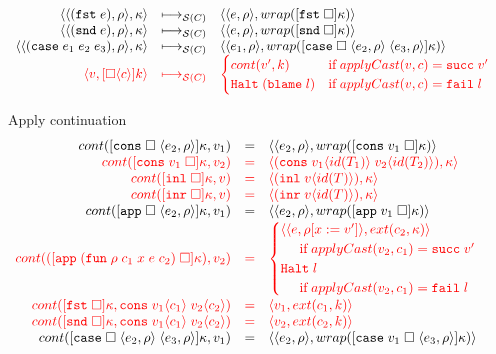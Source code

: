 \documentclass[acmsmall,review,anonymous]{acmart}\settopmatter{printfolios=true,printccs=false,printacmref=false}
\newcommand{\funrule}[3]{#1 &=& #2 & #3\\}
\newcommand{\hifunrule}[3]{\highlight{#1} &\highlight{=}& \highlight{#2} & 
\highlight{#3}\\}
\newcommand{\sOOinspect}[3]{\langle\langle#1,#2\rangle,#3\rangle}
\newcommand{\sOOreturn}[2]{\langle#1,#2\rangle}
\newcommand{\sOOhalt}[1]{\mathtt{Halt} \; #1}
\newcommand{\eOOcar}[1]{\mathtt{fst} \; #1}
\newcommand{\eOOcdr}[1]{\mathtt{snd} \; #1}
\newcommand{\eOOcase}[3]{\mathtt{case} \; #1 \; #2 \; #3}
\newcommand{\oOOblame}[1]{\mathtt{blame} \; #1}
\newcommand{\rOOsucc}[1]{\mathtt{succ}\;#1}
\newcommand{\rOOfail}[1]{\mathtt{fail}\;#1}
\newcommand{\kOOconsI}[3]{[\mathtt{cons} \; \square \; \langle#1,#2\rangle ]#3}
\newcommand{\kOOconsII}[2]{[\mathtt{cons} \; #1 \; \square]#2}
\newcommand{\kOOinl}[1]{[\mathtt{inl} \; \square]#1}
\newcommand{\kOOinr}[1]{[\mathtt{inr} \; \square]#1}
\newcommand{\kOOappI}[3]{
	[\mathtt{app} \; \square \; \langle#1,#2\rangle ]#3
}
\newcommand{\kOOappII}[2]{
	[\mathtt{app} \; #1 \; \square]#2}
\newcommand{\kOOcar}[1]{[\mathtt{fst} \; \square]#1}
\newcommand{\kOOcdr}[1]{[\mathtt{snd} \; \square]#1}
\newcommand{\kOOcaseI}[4]{
	[\mathtt{case} \; \square \; \langle#1,#3\rangle \; \langle#2,#3\rangle ]#4}
\newcommand{\kOOcaseII}[4]{
	[\mathtt{case} \; #1 \; \square \; \langle#2,#3\rangle ]#4}
\newcommand{\kOOcast}[2]{
	[\square \langle #1 \rangle]#2}
\newcommand{\hcvOOfun}[5]{\mathtt{fun} \; #2 \; #1 \; #3 \; #4 \; #5}
\newcommand{\hcvOOcons}[4]{\mathtt{cons}\;#1\langle#2\rangle\;#3\langle#4\rangle}
\newcommand{\hcvOOinl}[2]{\mathtt{inl}\;#1\langle#2\rangle}
\newcommand{\hcvOOinr}[2]{\mathtt{inr}\;#1\langle#2\rangle}
\newcommand{\sidecond}[1]{\text{if}\;#1}
\newcommand{\redruleS}[3]{#1 & \longmapsto_{\mathcal{S}(C)} & #2 & #3\\}
\newcommand{\hiredruleS}[3]{\highlight{#1} & 
\highlight{\longmapsto_{\mathcal{S}(C)}} & \highlight{#2} & \highlight{#3} \\}
\newcommand{\continue}[2]{cont(#2,#1)}
\newcommand{\highlight}[1]{{\color{red} #1}}
\begin{document}
\begin{figure}
\[\begin{array}{rclr}
	\redruleS{
		\sOOinspect{(\eOOcar{e})}{\rho}{\kappa}}{
		\sOOinspect{e}{\rho}{wrap(\kOOcar{\kappa})}}{}
	
	\redruleS{
		\sOOinspect{(\eOOcdr{e})}{\rho}{\kappa}}{
		\sOOinspect{e}{\rho}{wrap(\kOOcdr{\kappa})}}{}
	
	\redruleS{
		\sOOinspect{(\eOOcase{e_1}{e_2}{e_3})}{\rho}{\kappa}}{
		\sOOinspect{e_1}{\rho}{wrap(\kOOcaseI{e_2}{e_3}{\rho}{\kappa})}}{}
	\hiredruleS{
		\sOOreturn{v}{\kOOcast{c}{k}}
	}{
	\begin{cases}
	\continue{k}{v'} & \sidecond{applyCast(v,c) = \rOOsucc{v'}} 
	\\
	\sOOhalt{(\oOOblame{l})} & \sidecond{applyCast(v,c) = \rOOfail{l}}
	\end{cases}
	}{}
	\end{array}
	\]
	
	Apply continuation
	\fbox{$\continue{k}{v} = s$}
	\[
	\begin{array}{rclr}
	

\funrule{
	\continue{v_1}{\kOOconsI{e_2}{\rho}{\kappa}}}{
	\sOOinspect{e_2}{\rho}{wrap(\kOOconsII{v_1}{\kappa})}}{}

\hifunrule{
	\continue{v_2}{\kOOconsII{v_1}{\kappa}}}{
	\sOOreturn{(\hcvOOcons{v_1}{id(T_1)}{v_2}{id(T_2)})}{\kappa}}{}

\hifunrule{
	\continue{v}{\kOOinl{\kappa}}}{
	\sOOreturn{(\hcvOOinl{v}{id(T)})}{\kappa}}{}

\hifunrule{
	\continue{v}{\kOOinr{\kappa}}}{
	\sOOreturn{(\hcvOOinr{v}{id(T)})}{\kappa}}{}

\funrule{
	\continue{v_1}{\kOOappI{e_2}{\rho}{\kappa}}}{
	\sOOinspect{e_2}{\rho}{
		wrap(\kOOappII{v_1}{\kappa})
	}}{}
\hifunrule{
	\continue{v_2}{(\kOOappII{(\hcvOOfun{c_1}{\rho}{x}{e}{c_2})}{\kappa})}}{
\begin{cases}
	\sOOinspect{e}{\rho[x:=v']}{ext(c_2,\kappa)} \\
\;\;\;\;\;\sidecond{applyCast(v_2,c_1) = \rOOsucc{v'}}
\\
\sOOhalt{l} \\
\;\;\;\;\;\sidecond{applyCast(v_2,c_1) = \rOOfail{l}}
\end{cases}
}{}

\hifunrule{
	\continue{\hcvOOcons{v_1}{c_1}{v_2}{c_2}}{
		\kOOcar{\kappa}
	}
}{
	\sOOreturn{v_1}{ext(c_1,k)}
}{}
\hifunrule{
	\continue{\hcvOOcons{v_1}{c_1}{v_2}{c_2}}{
		\kOOcdr{\kappa}
	}
}{
	\sOOreturn{v_2}{ext(c_2,k)}
}{}

\funrule{
	\continue{v_1}{\kOOcaseI{e_2}{e_3}{\rho}{\kappa}}
}{
	\sOOinspect{e_2}{\rho}{
		wrap(\kOOcaseII{v_1}{e_3}{\rho}{\kappa})
	}
}{}


\end{array}\]
\end{figure}
\end{document}
